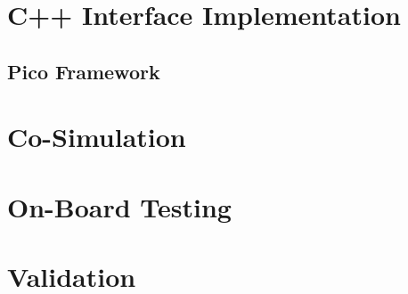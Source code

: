 \section{C++ Interface Implementation}

\subsection{Pico Framework}

\section{Co-Simulation}

\section{On-Board Testing}

\section{Validation}
